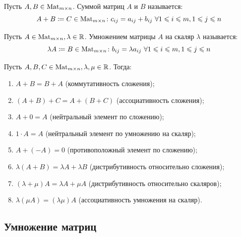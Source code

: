 \documentclass[12pt]{article}
\begin{document}
\begin{definition}
	Пусть $A,B \in \operatorname{Mat}_{m \times n}$. Суммой матриц $A$ и $B$ называется:
	\[A + B \coloneqq C \in \operatorname{Mat}_{m \times n}\colon c_{ij} = a_{ij} +
	b_{ij}\ \forall 1 \leqslant i \leqslant m, 1 \leqslant j \leqslant n\]
\end{definition}
\begin{definition}
	Пусть $A\in \operatorname{Mat}_{m \times n}, \lambda \in \mathbb{R}$. Умножением матрицы
	$A$ на скаляр $\lambda$ называется:
	\[\lambda A \coloneqq B \in \operatorname{Mat}_{m \times n}\colon b_{ij} = \lambda
	a_{ij}\ \forall 1 \leqslant i \leqslant m, 1 \leqslant j \leqslant n\]
\end{definition}
\begin{statement}
	Пусть $A,B,C \in \operatorname{Mat}_{m \times n}, \lambda, \mu \in \mathbb{R}$. Тогда:
	\begin{center}
		\begin{minipage}{0.75\textwidth}
			\begin{enumerate}[itemsep=0pt]
				\item $A + B = B + A$ (коммутативность сложения);
				\item $(A + B) + C = A + (B + C)$ (ассоциативность сложения);
				\item $A + 0 = A$ (нейтральный элемент по сложению);
				\item $1\cdot A = A$ (нейтральный элемент по умножению на скаляр);
				\item $A + (-A) = 0$ (противоположный элемент по сложению);
				\item $\lambda(A + B) = \lambda A + \lambda B$ (дистрибутивность
					относительно сложения);
				\item $(\lambda + \mu)A = \lambda A + \mu A$ (дистрибутивность
					относительно скаляров);
				\item $\lambda(\mu A) = (\lambda\mu)A$ (ассоциативность умножения
					на скаляр).
			\end{enumerate}
		\end{minipage}
	\end{center}
\end{statement}

\subsection{Умножение матриц}
\end{document}
